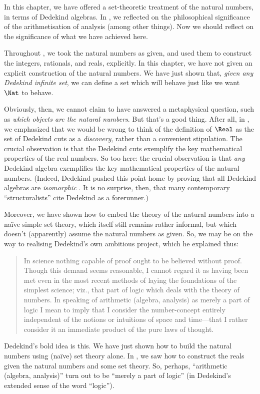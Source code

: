 \documentclass[../../../include/open-logic-section]{subfiles}
\begin{document}

In this chapter, we have offered a set-theoretic treatment of the
natural numbers, in terms of Dedekind algebras. In
, we reflected on the philosophical
significance of the arithmetisation of analysis (among other things).
Now we should reflect on the significance of what we have achieved
here.

Throughout , we took the natural numbers as
given, and used them to construct the integers, rationals, and reals,
explicitly. In this chapter, we have not given an explicit
construction of the natural numbers. We have just shown that,
\emph{given any Dedekind infinite set}, we can define a set which will
behave just like we want~$\Nat$ to behave. 

Obviously, then, we cannot claim to have answered a metaphysical
question, such as \emph{which objects are the natural numbers}. But
that's a good thing. After all, in  , we
emphasized that we would be wrong to think of the definition of
$\Real$ as the set of Dedekind cuts as a \emph{discovery}, rather than
a convenient stipulation. The crucial observation is that the Dedekind
cuts exemplify the key mathematical properties of the real
numbers. So too here: the crucial observation is that \emph{any}
Dedekind algebra exemplifies the key mathematical properties of the
natural numbers. (Indeed, Dedekind pushed this point home by proving
that all Dedekind algebras are \emph{isomorphic} \cite[Theorems
132--3]{Dedekind1888}. It is no surprise, then, that many
contemporary ``structuralists'' cite Dedekind as a forerunner.)

 Moreover, we have shown how to embed the theory of the natural
 numbers into a na\"ive simple set theory, which itself still remains
 rather informal, but which doesn't (apparently) assume the natural
 numbers as given. So, we may be on the way to realising Dedekind's
 own ambitious project, which he explained thus:
\begin{quote}
	In science nothing capable of proof ought to be believed without
	proof. Though this demand seems reasonable, I cannot regard it as
	having been met even in the most recent methods of laying the
	foundations of the simplest science; viz., that part of logic
	which deals with the theory of numbers. In speaking of arithmetic
	(algebra, analysis) as merely a part of logic I mean to imply that
	I consider the number-concept entirely independent of the notions
	or intuitions of space and time---that I rather consider it an
	immediate product of the pure laws of thought.
	\cite[preface]{Dedekind1888}
\end{quote}
Dedekind's bold idea is this. We have just shown how to build the
natural numbers using (na\"ive) set theory alone. In
, we saw how to construct the reals given
the natural numbers and some set theory. So, perhaps, ``arithmetic
(algebra, analysis)'' turn out to be ``merely a part of logic'' (in
Dedekind's extended sense of the word ``logic'').
\end{document}
